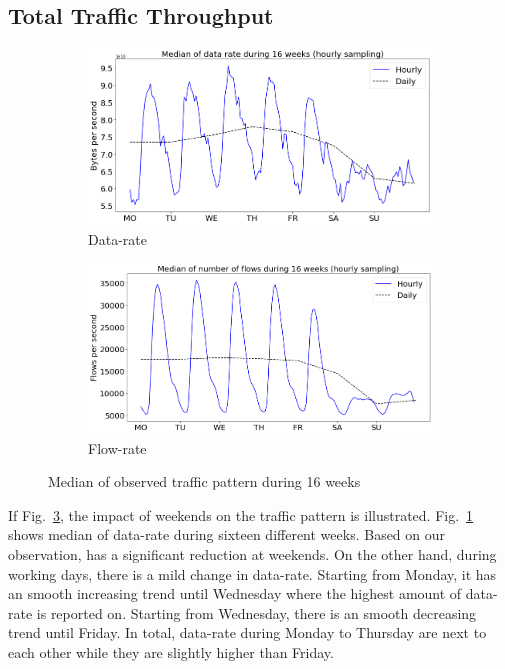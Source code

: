 \documentclass[10pt, journal, letterpaper]{IEEEtran}
\newcommand\linearFigSze{0.48}
\begin{document}
\subsection{Total Traffic Throughput}
\begin{figure}
    \begin{subfigure}{\linearFigSze\textwidth}
          \centering
          \includegraphics[width=\columnwidth]{img/OW_byterate.png}
          \caption{Data-rate}
          \label{fig:OW_bps}
    \end{subfigure}
    \begin{subfigure}{\linearFigSze\textwidth}
          \centering
          \includegraphics[width=\columnwidth]{img/OW_flowrate.png}
          \caption{Flow-rate}
          \label{fig:OW_fps}
    \end{subfigure}
    \caption{Median of observed traffic pattern during 16 weeks}
    \label{fig:OW_bps_fps}
\end{figure}
If Fig.~\ref{fig:OW_bps_fps}, the impact of weekends on the traffic pattern is illustrated. Fig.~\ref{fig:OW_bps} shows median of data-rate during sixteen different weeks. Based on our observation, has a significant reduction at weekends. On the other hand, during working days, there is a mild change in data-rate. Starting from Monday, it has an smooth increasing trend until Wednesday where the highest amount of data-rate is reported on. Starting from Wednesday, there is an smooth decreasing trend until Friday. In total, data-rate during Monday to Thursday are next to each other while they are slightly higher than Friday.
\end{document}
